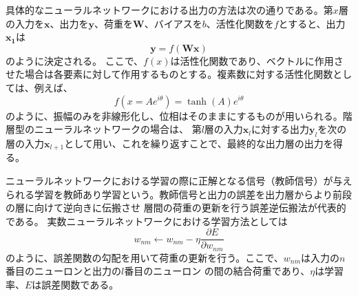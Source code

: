 \documentclass[11pt,a4paper,uplatex]{ujarticle}
\begin{document}
    具体的なニューラルネットワークにおける出力の方法は次の通りである。第$x$層の入力を$\bm{x}$、出力を$\bm{y}$、荷重を$\bm{W}$、バイアスを$b$、活性化関数を$f$とすると、出力$\bm{x_1}$は
    \begin{equation}
      \bm{y} = f(\bm{W}\bm{x})
    \end{equation}
    のように決定される。
    ここで、$f(x)$は活性化関数であり、ベクトルに作用させた場合は各要素に対して作用するものとする。複素数に対する活性化関数としては、例えば、
    \begin{equation}\label{activation_function}
      f(x = Ae^{i\theta}) = \tanh(A)e^{i\theta}
    \end{equation}
    のように、振幅のみを非線形化し、位相はそのままにするものが用いられる。階層型のニューラルネットワークの場合は、
    第$l$層の入力$\bm{x}_l$に対する出力$\bm{y}_l$を次の層の入力$\bm{x}_{l+1}$として用い、これを繰り返すことで、最終的な出力層の出力を得る。

    ニューラルネットワークにおける学習の際に正解となる信号（教師信号）が与えられる学習を教師あり学習という。教師信号と出力の誤差を出力層からより前段の層に向けて逆向きに伝搬させ
    層間の荷重の更新を行う誤差逆伝搬法が代表的である。
    実数ニューラルネットワークにおける学習方法としては
    \begin{equation}
      w_{nm} \leftarrow w_{nm} - \eta \frac{\partial E}{\partial w_{nm}}
    \end{equation}
    のように、誤差関数の勾配を用いて荷重の更新を行う。ここで、$w_{nm}$は入力の$n$番目のニューロンと出力の$l$番目のニューロン
    の間の結合荷重であり、$\eta$は学習率、$E$は誤差関数である。
\end{document}
